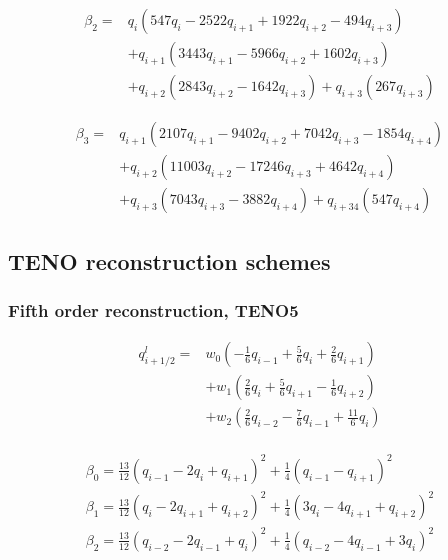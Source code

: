 \begin{equation}
\begin{aligned}
\beta_{2}=& q_{i}\left(547 q_{i}-2522 q_{i+1}+1922 q_{i+2}-494 q_{i+3}\right) \\
&+q_{i+1}\left(3443 q_{i+1}-5966 q_{i+2}+1602 q_{i+3}\right) \\
&+q_{i+2}\left(2843 q_{i+2}-1642 q_{i+3}\right)+q_{i+3}\left(267 q_{i+3}\right)
\end{aligned}
\end{equation}

\begin{equation}
\begin{aligned}
\beta_{3}=& q_{i+1}\left(2107 q_{i+1}-9402 q_{i+2}+7042 q_{i+3}-1854 q_{i+4}\right) \\
&+q_{i+2}\left(11003 q_{i+2}-17246 q_{i+3}+4642 q_{i+4}\right) \\
&+q_{i+3}\left(7043 q_{i+3}-3882 q_{i+4}\right)+q_{i+34}\left(547 q_{i+4}\right)
\end{aligned}
\end{equation}


\subsection{TENO reconstruction schemes}

\subsubsection{Fifth order reconstruction, TENO5}

\begin{equation}
\begin{aligned}
q_{i+1 / 2}^{l}=& w_{0}\left(-\frac{1}{6} q_{i-1}+\frac{5}{6} q_{i}+\frac{2}{6} q_{i+1}\right) \\
&+w_{1}\left(\frac{2}{6} q_{i}+\frac{5}{6} q_{i+1}-\frac{1}{6} q_{i+2}\right) \\
&+w_{2}\left(\frac{2}{6} q_{i-2}-\frac{7}{6} q_{i-1}+\frac{11}{6} q_{i}\right) \\
\end{aligned}
\end{equation}

\begin{equation}
\begin{array}{l}
\beta_{0}=\frac{13}{12}\left(q_{i-1}-2 q_{i}+q_{i+1}\right)^{2}+\frac{1}{4}\left(q_{i-1}-q_{i+1}\right)^{2}\\
\beta_{1}=\frac{13}{12}\left(q_{i}-2 q_{i+1}+q_{i+2}\right)^{2}+\frac{1}{4}\left(3 q_{i}-4 q_{i+1}+q_{i+2}\right)^{2}\\
\beta_{2}=\frac{13}{12}\left(q_{i-2}-2 q_{i-1}+q_{i}\right)^{2}+\frac{1}{4}\left(q_{i-2}-4 q_{i-1}+3 q_{i}\right)^{2}\\
\end{array}
\end{equation}

